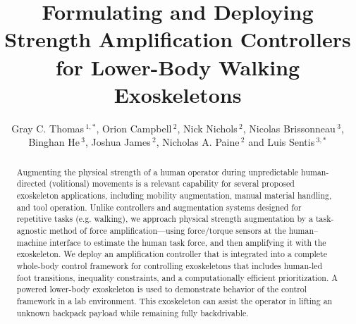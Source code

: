 \documentclass[utf8]{frontiersSCNS}
\def\firstAuthorLast{Thomas {et~al.}} %
\def\Authors{Gray C. Thomas\,$^{1,*}$, Orion Campbell\,$^{2}$, Nick Nichols\,$^{2}$, Nicolas Brissonneau\,$^{3}$, Binghan He\,$^{3}$, Joshua James\,$^{2}$,  Nicholas A. Paine\,$^{2}$ and Luis Sentis\,$^{3,*}$}
\begin{document}
\onecolumn
{}
\title[Deploying Strength Amplification]{Formulating and Deploying Strength Amplification Controllers for Lower-Body Walking Exoskeletons}
\author[\firstAuthorLast ]{\Authors} %
\address{} %
\correspondance{} %

\extraAuth{}
\maketitle

\begin{abstract}
Augmenting the physical strength of a human operator during unpredictable human-directed (volitional) movements is a relevant capability for several proposed exoskeleton applications, including mobility augmentation, manual material handling, and tool operation. 
Unlike controllers and augmentation systems designed for repetitive tasks (e.g. walking), we approach physical strength augmentation by a task-agnostic method of force amplification---using force/torque sensors at the human--machine interface to estimate the human task force, and then amplifying it with the exoskeleton.
We deploy an amplification controller that is integrated into a complete whole-body control framework for controlling exoskeletons that includes human-led foot transitions, inequality constraints, and a computationally efficient prioritization.
A powered lower-body exoskeleton is used to demonstrate behavior of the control framework in a lab environment.
This exoskeleton can assist the operator in lifting an unknown backpack payload while remaining fully backdrivable.
\end{abstract}




\end{document}
